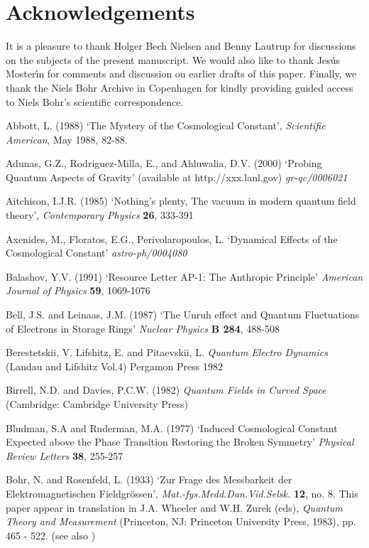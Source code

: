\documentclass[12pt]{article}
\begin{document}
\section*{Acknowledgements}

\noindent
It is a pleasure to thank Holger Bech Nielsen and Benny Lautrup
for discussions on the subjects of the present manuscript. We
would also like to thank Jes\' us Moster{\'\i}n for comments and
discussion on earlier drafts of this paper. Finally, we thank
the Niels Bohr Archive in Copenhagen for kindly providing
guided access to Niels Bohr's scientific correspondence. 

 

\newpage
\begin{thebibliography}{X}

Abbott, L. (1988) `The Mystery of the Cosmological Constant',
{\em Scientific American}, May 1988, 82-88.

 Adunas, G.Z., Rodriguez-Milla, E., and Ahluwalia, D.V.
(2000) `Probing Quantum Aspects of Gravity' (available at 
http://xxx.lanl.gov) {\em gr-qc/0006021}

 Aitchison, I.J.R. (1985) `Nothing's plenty, The vacuum in
modern quantum field theory', {\em Contemporary Physics} {\bf 26},
333-391

 Axenides, M., Floratos, E.G., Perivolaropoulos, L.
`Dynamical Effects of the Cosmological Constant' 
{\em astro-ph/0004080}
     
Balashov, Y.V. (1991) `Resource Letter AP-1: The Anthropic
Principle' {\em American Journal of Physics} {\bf 59}, 
 1069-1076

Bell, J.S. and Leinaas, J.M. (1987) `The Unruh effect and Quantum
Fluctuations of Electrons in Storage Rings' {\em Nuclear Physics}
{\bf B 284}, 488-508

 Berestetskii, V. Lifshitz, E. and 
Pitaevskii, L. {\em Quantum Electro Dynamics} (Landau and
Lifshitz Vol.4) Pergamon Press 1982

 Birrell, N.D. and Davies, P.C.W. (1982)
{\em Quantum Fields in Curved Space}
(Cambridge: Cambridge University Press)

Bludman, S.A and Ruderman, M.A. (1977) `Induced Cosmological Constant 
Expected above the Phase Transition Restoring the Broken Symmetry'
{\em Physical Review Letters} {\bf 38}, 255-257

Bohr, N. and Rosenfeld, L. (1933) `Zur Frage des Messbarkeit der Elektromagnetischen
Fieldgr\"{o}ssen', {\em Mat.-fys.Medd.Dan.Vid.Selsk.} {\bf 12},
no. 8. This paper appear in translation in
J.A. Wheeler and W.H. Zurek (eds), {\em Quantum Theory and Measurement}
(Princeton, NJ: Princeton University Press, 1983), pp. 465 - 522.
(see also \cite{kalckar96})


\end{thebibliography}
\end{document}
